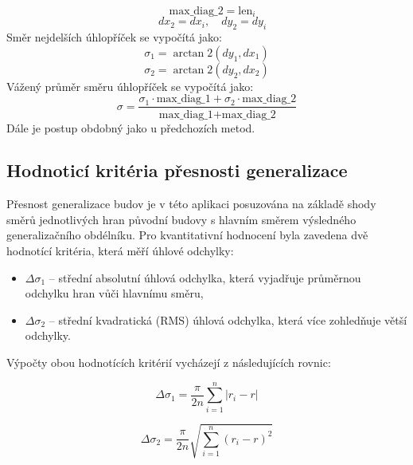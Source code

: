 \begin{equation}
    \quad \text{max\_diag\_2} = \text{len}_i
\end{equation}
\begin{equation}
    \quad dx_2 = dx_i, \quad dy_2 = dy_i
\end{equation}
Směr nejdelších úhlopříček se vypočítá jako:
\begin{equation}
    \sigma_1 = \arctan2(dy_1, dx_1)
\end{equation}
\begin{equation}
    \sigma_2 = \arctan2(dy_2, dx_2)
\end{equation}
Vážený průměr směru úhlopříček se vypočítá jako:
\begin{equation}
    \sigma = \frac{\sigma_1 \cdot \text{max\_diag\_1} + \sigma_2 \cdot \text{max\_diag\_2}}{\text{max\_diag\_1} + \text{max\_diag\_2}}
\end{equation}
Dále je postup obdobný jako u předchozích metod.
\newpage


\subsection{Hodnoticí kritéria přesnosti generalizace}

Přesnost generalizace budov je v této aplikaci posuzována na základě shody směrů jednotlivých hran původní budovy s hlavním směrem výsledného generalizačního obdélníku. Pro kvantitativní hodnocení byla zavedena dvě hodnotící kritéria, která měří úhlové odchylky:

\begin{itemize}
    \item $\Delta \sigma_1$ – střední absolutní úhlová odchylka, která vyjadřuje průměrnou odchylku hran vůči hlavnímu směru,
    \item $\Delta \sigma_2$ – střední kvadratická (RMS) úhlová odchylka, která více zohledňuje větší odchylky.
\end{itemize}

Výpočty obou hodnotících kritérií vycházejí z následujících rovnic:

\begin{equation}
    \Delta \sigma_1 = \frac{\pi}{2n} \sum_{i=1}^{n} \left| r_i - r \right|
\end{equation}

\begin{equation}
    \Delta \sigma_2 = \frac{\pi}{2n} \sqrt{ \sum_{i=1}^{n} \left( r_i - r \right)^2 }
\end{equation}

